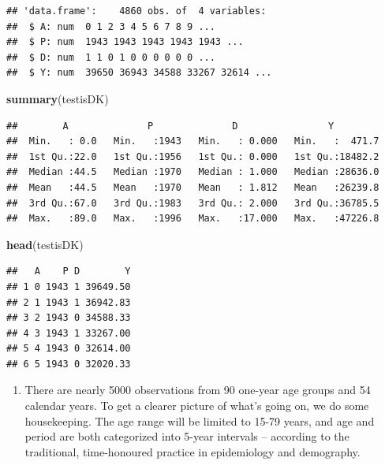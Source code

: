 \documentclass[
]{book}
\newenvironment{Shaded}{\begin{snugshade}}{\end{snugshade}}
\newcommand{\FunctionTok}[1]{\textcolor[rgb]{0.13,0.29,0.53}{\textbf{#1}}}
\newcommand{\NormalTok}[1]{#1}
\providecommand{\tightlist}{%
  \setlength{\itemsep}{0pt}\setlength{\parskip}{0pt}}
\theoremstyle{definition}
\theoremstyle{definition}
\theoremstyle{definition}
\theoremstyle{definition}
\theoremstyle{remark}
\begin{document}
\begin{verbatim}
## 'data.frame':    4860 obs. of  4 variables:
##  $ A: num  0 1 2 3 4 5 6 7 8 9 ...
##  $ P: num  1943 1943 1943 1943 1943 ...
##  $ D: num  1 1 0 1 0 0 0 0 0 0 ...
##  $ Y: num  39650 36943 34588 33267 32614 ...
\end{verbatim}

\begin{Shaded}
\begin{Highlighting}[]
\FunctionTok{summary}\NormalTok{(testisDK)}
\end{Highlighting}
\end{Shaded}

\begin{verbatim}
##        A              P              D                Y          
##  Min.   : 0.0   Min.   :1943   Min.   : 0.000   Min.   :  471.7  
##  1st Qu.:22.0   1st Qu.:1956   1st Qu.: 0.000   1st Qu.:18482.2  
##  Median :44.5   Median :1970   Median : 1.000   Median :28636.0  
##  Mean   :44.5   Mean   :1970   Mean   : 1.812   Mean   :26239.8  
##  3rd Qu.:67.0   3rd Qu.:1983   3rd Qu.: 2.000   3rd Qu.:36785.5  
##  Max.   :89.0   Max.   :1996   Max.   :17.000   Max.   :47226.8
\end{verbatim}

\begin{Shaded}
\begin{Highlighting}[]
\FunctionTok{head}\NormalTok{(testisDK)}
\end{Highlighting}
\end{Shaded}

\begin{verbatim}
##   A    P D        Y
## 1 0 1943 1 39649.50
## 2 1 1943 1 36942.83
## 3 2 1943 0 34588.33
## 4 3 1943 1 33267.00
## 5 4 1943 0 32614.00
## 6 5 1943 0 32020.33
\end{verbatim}

\begin{enumerate}
\def\labelenumi{\arabic{enumi}.}
\setcounter{enumi}{1}
\tightlist
\item
  There are nearly 5000 observations from 90 one-year age groups and
  54 calendar years. To get a clearer picture of what's going on, we
  do some housekeeping. The age range will be limited to 15-79 years,
  and age and period are both categorized into 5-year intervals --
  according to the traditional, time-honoured practice in epidemiology
  and demography.
\end{enumerate}
\end{document}

